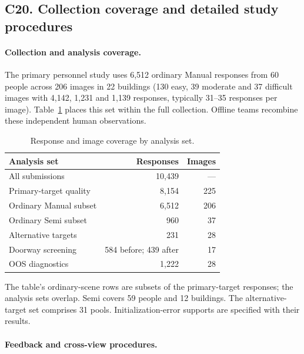 
\subsection*{C20. Collection coverage and detailed study procedures}

\paragraph{Collection and analysis coverage.}

The primary personnel study uses 6,512 ordinary Manual responses from 60 people across 206 images in 22 buildings (130 easy, 39 moderate and 37 difficult images with 4,142, 1,231 and 1,139 responses, typically 31--35 responses per image). Table~\ref{tab:collection-coverage} places this set within the full collection. Offline teams recombine these independent human observations.



\begin{table}[!ht]
\centering\small
\caption{Response and image coverage by analysis set.}
\label{tab:collection-coverage}
\setlength{\tabcolsep}{4pt}\renewcommand{\arraystretch}{1.13}
\begin{tabular*}{\linewidth}{@{\extracolsep{\fill}}lrr@{}}
\hline
Analysis set & Responses & Images\\\hline
All submissions & 10,439 & ---\\
Primary-target quality & 8,154 & 225\\
\quad Ordinary Manual subset & 6,512 & 206\\
\quad Ordinary Semi subset & 960 & 37\\\hline
Alternative targets & 231 & 28\\
Doorway screening & 584 before; 439 after & 17\\
OOS diagnostics & 1,222 & 28\\\hline
\end{tabular*}
\end{table}

The table's ordinary-scene rows are subsets of the primary-target responses; the analysis sets overlap. Semi covers 59 people and 12 buildings. The alternative-target set comprises 31 pools. Initialization-error supports are specified with their results.



\paragraph{Feedback and cross-view procedures.}

